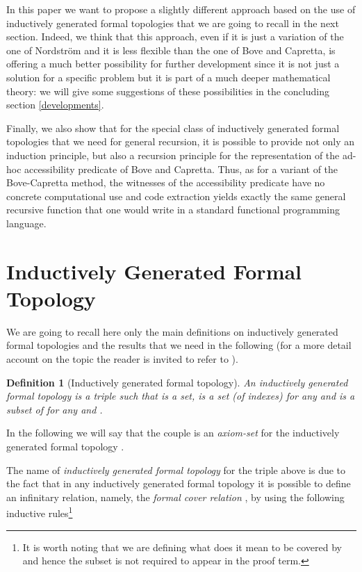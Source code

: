 \documentclass[copyright,creativecommons]{eptcs}
\newtheorem{definition}{Definition}[section]
\begin{document}
In this paper we want to propose a slightly different approach based
on the use of inductively generated formal topologies that we are going to recall
in the next section.
Indeed, we think that this approach, even if it is just a variation of the one of 
Nordstr\"om and it is less flexible than the one of Bove and Capretta, is offering a much 
better possibility for further development since it is not just a solution for 
a specific problem but it is part of a much deeper mathematical theory: we will 
give some suggestions of these possibilities in the concluding section \ref{developments}.  

Finally, we also show that for the special class of inductively generated
formal topologies that we need for general recursion, it is possible to provide
not only an induction principle, but also a recursion principle for the
representation of the ad-hoc accessibility predicate of Bove and Capretta.
Thus, as for a variant of the Bove-Capretta method, the witnesses of the
accessibility predicate have no concrete computational use and code extraction
yields exactly the same general recursive function that one would write in a
standard functional programming language.

\section{Inductively Generated Formal Topology}
\label{formalTopology}

We are going to recall here only the main definitions on inductively generated 
formal topologies and the results that we need in the following (for a more detail 
account on the topic the reader is invited to refer to \cite{TIG,Val06}).

\begin{definition}[Inductively generated formal topology]
An {\em inductively generated formal topology} is a triple  such that
 is a set,  is a set (of indexes) for any  and  
is a subset of  for any  and .
\end{definition}

In the following we will say that the couple  is an {\em axiom-set} for
the inductively generated formal topology .
\medskip

The name of {\em inductively generated formal topology} for the triple above
is due to the fact that in any inductively generated formal topology  
it is possible to define an infinitary relation, namely, the {\em formal cover relation} 
, by using the following inductive rules\footnote{It is worth noting
that we are defining what does it mean to be covered by  and hence the
subset  is not required to appear in the proof term.}
\end{document}
